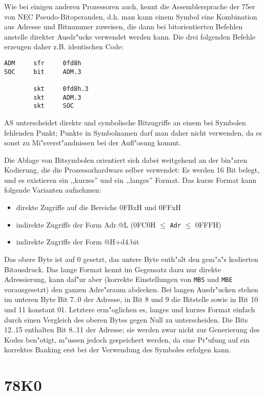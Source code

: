 \documentclass[12pt,a4paper,twoside]{report}
\newcommand{\tty}[1]{{\tt #1}}
\begin{document}
Wie bei einigen anderen Prozessoren auch, kennt die Assemblersprache
der 75er von NEC Pseudo-Bitoperanden, d.h. man kann einem Symbol
eine Kombination aus Adresse und Bitnummer zuweisen, die dann bei
bitorientierten Befehlen anstelle direkter Ausdr"ucke verwendet werden
kann.  Die drei folgenden Befehle erzeugen daher z.B. identischen
Code:
\begin{verbatim}
ADM     sfr     0fd8h
SOC     bit     ADM.3

        skt     0fd8h.3
        skt     ADM.3
        skt     SOC
\end{verbatim}
AS unterscheidet direkte und symbolische Bitzugriffe an einem
bei Symbolen fehlenden Punkt; Punkte in Symbolnamen darf man daher
nicht verwenden, da es sonst zu Mi"sverst"andnissen bei der Aufl"osung
kommt.
\par
Die Ablage von Bitsymbolen orientiert sich dabei weitgehend an der
bin"aren Kodierung, die die Prozessorhardware selber verwendet:  Es
werden 16 Bit belegt, und es existieren ein ,,kurzes'' und ein ,,langes''
Format.  Das kurze Format kann folgende Varianten aufnehmen:
\begin{itemize}
 \item{direkte Zugriffe auf die Bereiche 0FBxH und 0FFxH}
 \item{indirekte Zugriffe der Form Adr.@L (0FC0H $\leq$ \tty{Adr} $\leq$ 0FFFH)}
 \item{indirekte Zugriffe der Form @H+d4.bit}
\end{itemize}
Das obere Byte ist auf 0 gesetzt, das untere Byte enth"alt den gem"a"s
\cite{NEC75} kodierten Bitausdruck.  Das lange Format kennt im Gegensatz
dazu nur direkte Adressierung, kann daf"ur aber (korrekte Einstellungen
von \tty{MBS} und \tty{MBE} vorausgesetzt) den ganzen Adre"sraum abdecken.
Bei langen Ausdr"ucken stehen im unteren Byte Bit 7..0 der Adresse, in
Bit 8 und 9 die Bitstelle sowie in Bit 10 und 11 konstant 01.  Letztere
erm"oglichen es, langes und kurzes Format einfach durch einen Vergleich
des oberen Bytes gegen Null zu unterscheiden.  Die Bits 12..15 enthalten
Bit 8..11 der Adresse; sie werden zwar nicht zur Generierung des Kodes
ben"otigt, m"ussen jedoch gespeichert werden, da eine Pr"ufung auf ein
korrektes Banking erst bei der Verwendung des Symboles erfolgen kann.


\section{78K0}
\label{78K0Spec}
\end{document}

